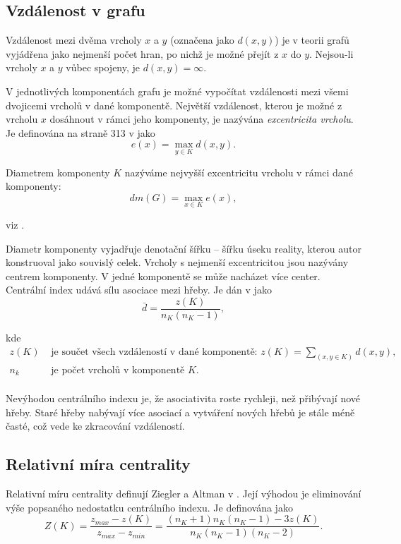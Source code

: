 \documentclass[dp.tex]{subfiles}
\begin{document}
\subsection{Vzdálenost v grafu}
Vzdálenost mezi dvěma vrcholy $x$ a $y$ (označena jako $d(x,y)$) je v teorii grafů vyjádřena jako nejmenší počet hran, po nichž je možné přejít z $x$ do $y$. Nejsou-li vrcholy $x$ a $y$ vůbec spojeny, je $d(x,y)=\infty$.

V jednotlivých komponentách grafu je možné vypočítat vzdálenosti mezi všemi dvojicemi vrcholů v dané komponentě. Největší vzdálenost, kterou je možné z  vrcholu $x$ dosáhnout v rámci jeho komponenty, je nazývána \textit{excentricita vrcholu}. Je definována na straně 313 v \cite{Wimmer2003} jako
\begin{equation}
e(x)=\max_{y \in K} d(x,y).
\end{equation}

Diametrem komponenty $K$ nazýváme nejvyšší excentricitu vrcholu v rámci dané komponenty:
\begin{equation}
dm(G)=\max_{x \in K} e(x),
\end{equation}

viz \cite[str. 315]{Wimmer2003}.

Diametr komponenty vyjadřuje denotační šířku -- šířku úseku reality, kterou autor konstruoval jako souvislý celek. Vrcholy s nejmenší excentricitou jsou nazývány centrem komponenty. V jedné komponentě se může nacházet více center.
Centrální index udává sílu asociace mezi hřeby. Je dán v \cite[str. 315]{Wimmer2003} jako
\begin{equation}
\bar{d}=\frac{z(K)}{n_K (n_K-1)},
\end{equation}

kde
\begin{align*}
	z(K) & \text{ je součet všech vzdáleností v dané komponentě: 
$z(K)=\sum_{(x,y \in K)} d(x,y)$,}\\
	n_k & \text{ je počet vrcholů v komponentě $K$.}\\
\end{align*} 

Nevýhodou centrálního indexu je, že asociativita roste rychleji, než přibývají nové hřeby. Staré hřeby nabývají více asociací a vytváření nových hřebů je stále méně časté, což vede ke zkracování vzdáleností.


\subsection{Relativní míra centrality}
Relativní míru centrality definují Ziegler a Altman v \cite[str. 315]{ZieglerAltmann2002}. Její výhodou je eliminování výše popsaného nedostatku centrálního indexu. Je definována jako
\begin{equation}
Z(K)=\frac{z_{max}-z(K)}{z_{max}-z_{min}}=
\frac{(n_K+1) n_K (n_K-1)-3z(K)}{n_K (n_K-1)(n_K-2)} .
\end{equation}
\end{document}
